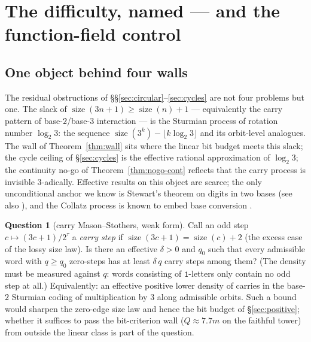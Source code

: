 \documentclass[11pt]{amsart}
\theoremstyle{definition}
\newtheorem{question}[theorem]{Question}
\theoremstyle{remark}
\newcommand{\size}{\operatorname{size}}
\begin{document}
\section{The difficulty, named --- and the function-field control}
\label{sec:ff}\label{sec:difficulty}

\subsection{One object behind four walls}
The residual obstructions of \S\S\ref{sec:circular}--\ref{sec:cycles} are
not four problems but one.  The slack of $\size(3n+1) \ge \size(n)+1$ ---
equivalently the carry pattern of base-$2$/base-$3$ interaction --- is the
Sturmian process of rotation number $\log_2 3$: the sequence
$\size(3^k) - \lfloor k\log_2 3\rfloor$ and its orbit-level analogues.  The
wall of Theorem~\ref{thm:wall} sits where the linear bit budget meets this
slack; the cycle ceiling of \S\ref{sec:cycles} is the effective rational
approximation of $\log_2 3$; the continuity no-go of
Theorem~\ref{thm:nogo-cont} reflects that the carry process is invisible
$3$-adically.  Effective results on this object are scarce; the only
unconditional anchor we know is Stewart's theorem on digits in two bases
\cite{Stewart1980} (see also \cite{SengeStraus1973}), and the Collatz
process is known to embed base conversion \cite{SterinWoods2020}.

\begin{question}[carry Mason--Stothers, weak form]\label{q:cms}
Call an odd step $c \mapsto (3c+1)/2^{\tau}$ a \emph{carry step} if
$\size(3c+1) = \size(c) + 2$ (the excess case of the lossy size law).  Is
there an effective $\delta > 0$ and $q_0$ such that every admissible word
with $q \ge q_0$ zero-steps has at least $\delta\,q$ carry steps among them?
(The density must be measured against $q$: words consisting of
$\mathtt{1}$-letters only contain no odd step at all.)  Equivalently: an
effective positive lower density of carries in the base-$2$ Sturmian coding
of multiplication by $3$ along admissible orbits.  Such a bound would sharpen
the zero-edge size law and hence the bit budget of \S\ref{sec:positive};
whether it suffices to pass the bit-criterion wall ($Q \approx 7.7m$ on the
faithful tower) from outside the linear class is part of the question.
\end{question}
\end{document}
